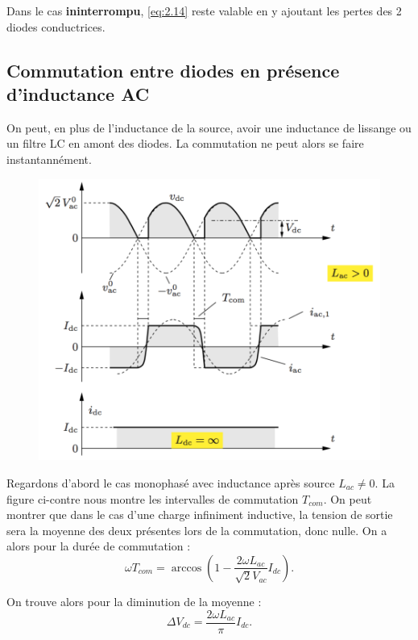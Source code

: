 		Dans le cas \textbf{ininterrompu}, \eqref{eq:2.14} reste valable en y ajoutant les pertes des 2 diodes conductrices. 
		
	\subsection{Commutation entre diodes en présence d'inductance AC}
		On peut, en plus de l'inductance de la source, avoir une inductance de lissange ou un filtre LC en amont des diodes. La commutation ne peut alors se faire instantannément. \\
		
	\begin{figure}
		\vspace{-5mm}
		\includegraphics[scale=0.3]{ch2/12}
		\end{figure} 
		Regardons d'abord le cas monophasé avec inductance après source $L_{ac} \neq 0$. La figure ci-contre nous montre les intervalles de commutation $T_{com}$. On peut montrer que dans le cas d'une charge infiniment inductive, la tension de sortie sera la moyenne des deux présentes lors de la commutation, donc nulle. On a alors pour la durée de commutation : 
		\begin{equation}
			\omega T_{com} = \arccos \left( 1-\frac{2\omega L_{ac}}{\sqrt{2}V_{ac}} I_{dc}\right). 
		\end{equation}
		
		On trouve alors pour la diminution de la moyenne : 
		\begin{equation}
			\Delta V_{dc} = \frac{2\omega L_{ac}}{\pi}I_{dc}. 
		\end{equation}
		
